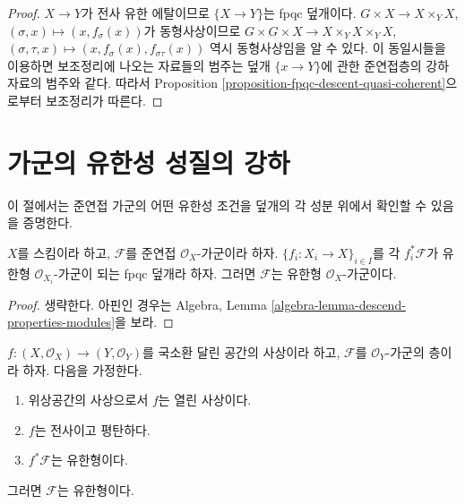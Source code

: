 \begin{proof}
$X \to Y$가 전사 유한 에탈이므로 $\{X \to Y\}$는 fpqc 덮개이다.
$G \times X \to X \times_Y X$, $(\sigma, x) \mapsto (x, f_\sigma(x))$가
동형사상이므로
$G \times G \times X \to X \times_Y X \times_Y X$,
$(\sigma, \tau, x) \mapsto (x, f_\sigma(x), f_{\sigma\tau}(x))$
역시 동형사상임을 알 수 있다. 이 동일시들을 이용하면 보조정리에 나오는
자료들의 범주는 덮개 $\{x \to Y\}$에 관한 준연접층의 강하 자료의 범주와
같다. 따라서 Proposition
\ref{proposition-fpqc-descent-quasi-coherent}으로부터 보조정리가 따른다.
\end{proof}









\section{가군의 유한성 성질의 강하}
\label{section-descent-finiteness}

\noindent
이 절에서는 준연접 가군의 어떤 유한성 조건을 덮개의 각 성분 위에서
확인할 수 있음을 증명한다.

\begin{lemma}
\label{lemma-finite-type-descends}
$X$를 스킴이라 하고, $\mathcal{F}$를 준연접 $\mathcal{O}_X$-가군이라
하자. $\{f_i : X_i \to X\}_{i \in I}$를 각 $f_i^*\mathcal{F}$가 유한형
$\mathcal{O}_{X_i}$-가군이 되는 fpqc 덮개라 하자. 그러면 $\mathcal{F}$는
유한형 $\mathcal{O}_X$-가군이다.
\end{lemma}

\begin{proof}
생략한다. 아핀인 경우는 Algebra, Lemma
\ref{algebra-lemma-descend-properties-modules}을 보라.
\end{proof}

\begin{lemma}
\label{lemma-finite-type-descends-fppf}
$f : (X, \mathcal{O}_X) \to (Y, \mathcal{O}_Y)$를 국소환 달린 공간의
사상이라 하고, $\mathcal{F}$를 $\mathcal{O}_Y$-가군의 층이라 하자. 다음을
가정한다.
\begin{enumerate}
\item 위상공간의 사상으로서 $f$는 열린 사상이다.
\item $f$는 전사이고 평탄하다.
\item $f^*\mathcal{F}$는 유한형이다.
\end{enumerate}
그러면 $\mathcal{F}$는 유한형이다.
\end{lemma}

